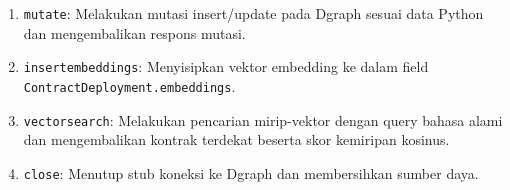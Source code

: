 \begin{enumerate}
    \item \texttt{mutate}: Melakukan mutasi insert/update pada Dgraph sesuai data Python dan mengembalikan respons mutasi.
    \item \texttt{insert\textunderscore embeddings}: Menyisipkan vektor embedding ke dalam field \texttt{ContractDeployment.embeddings}.
    \item \texttt{vector\textunderscore search}: Melakukan pencarian mirip-vektor dengan query bahasa alami dan mengembalikan kontrak terdekat beserta skor kemiripan kosinus.
    \item \texttt{close}: Menutup stub koneksi ke Dgraph dan membersihkan sumber daya.
\end{enumerate}